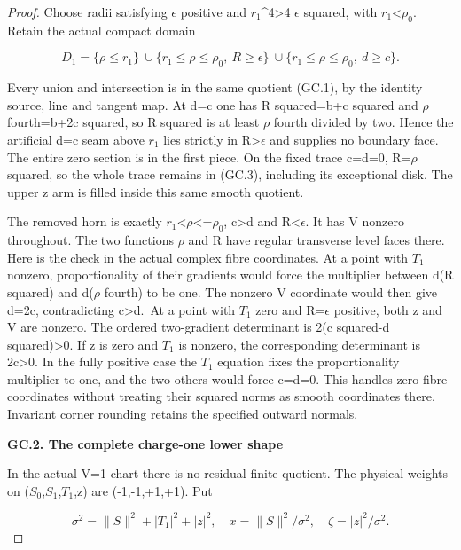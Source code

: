\begin{proof}
Choose radii satisfying \(\epsilon\) positive and
\(r_1\)\^{}4\textgreater4 \(\epsilon\) squared, with \(r_1\)\textless{}\(\rho_0\). Retain the actual compact
domain

\[
 D_1=\{\rho\le r_1\}\ \cup
 \{r_1\le\rho\le\rho_0,\ R\ge\epsilon\}\ \cup
 \{r_1\le\rho\le\rho_0,\ d\ge c\}.              \tag{GC.3}
\]

Every union and intersection is in the same quotient (GC.1), by
the identity source, line and tangent map. At d=c one has
R squared=b+c squared and \(\rho\) fourth=b+2c squared, so
R squared is at least \(\rho\) fourth divided by two. Hence the
artificial d=c seam above \(r_1\) lies strictly in R\textgreater{}\(\epsilon\) and
supplies no boundary face. The entire zero section is in the
first piece. On the fixed trace c=d=0, R=\(\rho\) squared, so the
whole trace remains in (GC.3), including its exceptional disk.
The upper z arm is filled inside this same smooth quotient.

The removed horn is exactly \(r_1\)\textless{}\(\rho\)\textless=\(\rho_0\), c\textgreater d and R\textless{}\(\epsilon\).
It has V nonzero throughout. The two functions \(\rho\) and R have
regular transverse level faces there. Here is the check in the
actual complex fibre coordinates. At a point with \(T_1\) nonzero,
proportionality of their gradients would force the multiplier
between d(R squared) and d(\(\rho\) fourth) to be one. The nonzero
V coordinate would then give d=2c, contradicting c\textgreater d.~At a
point with \(T_1\) zero and R=\(\epsilon\) positive, both z and V are
nonzero. The ordered two-gradient determinant is
2(c squared-d squared)\textgreater0. If z is zero and \(T_1\) is nonzero,
the corresponding determinant is 2c\textgreater0. In the fully positive
case the \(T_1\) equation fixes the proportionality multiplier
to one, and the two others would force c=d=0. This handles zero
fibre coordinates without treating their squared norms as
smooth coordinates there. Invariant corner rounding retains
the specified outward normals.

\par

\medskip\noindent\textbf{GC.2. The complete charge-one lower shape}

\par\nobreak

In the actual V=1 chart there is no residual finite quotient.
The physical weights on (\(S_0\),\(S_1\),\(T_1\),z) are (-1,-1,+1,+1). Put

\[
 \sigma^2=\|S\|^2+|T_1|^2+|z|^2,\quad
 x=\|S\|^2/\sigma^2,\quad \zeta=|z|^2/\sigma^2.
\]


\end{proof}
